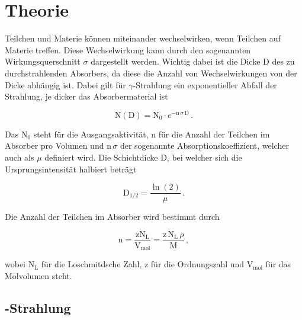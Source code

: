 \section{Theorie}

\begin{flushleft}
    Teilchen und Materie können miteinander wechselwirken, wenn Teilchen auf Materie treffen.
    Diese Wechselwirkung kann durch den sogenannten Wirkungsquerschnitt $\sigma$ dargestellt werden.
    Wichtig dabei ist die Dicke D des zu durchstrahlenden Absorbers, da diese die Anzahl von Wechselwirkungen von der Dicke abhängig ist.
    Dabei gilt für $\gamma$-Strahlung ein exponentieller Abfall der Strahlung, je dicker das Absorbermaterial ist
\end{flushleft}

\begin{equation}
    \text{N}(\text{D}) = \text{N}_{0} \cdot e^{-\text{n}\,\sigma\,\text{D}}\,. \label{1}
\end{equation}

\begin{flushleft}
    Das $\text{N}_{0}$ steht für die Ausgangsaktivität, n für die Anzahl der Teilchen im Absorber pro Volumen und $\text{n}\,\sigma$ der sogenannte Absorptionskoeffizient, welcher auch als $\mu$ definiert wird.
    Die Schichtdicke D, bei welcher sich die Ursprungsintensität halbiert beträgt 
\end{flushleft}

\begin{equation}
    \text{D}_{1/2} = \frac{\ln(2)}{\mu}\,. \label{2}
\end{equation}

\begin{flushleft}
    Die Anzahl der Teilchen im Absorber wird bestimmt durch
\end{flushleft}

\begin{equation}
    \text{n} = \frac{\text{z}\text{N}_{\text{L}}}{\text{V}_{\text{mol}}} = \frac{\text{z}\,\text{N}_{\text{L}}\,\rho}{\text{M}}\,, \label{3}
\end{equation}

\begin{flushleft}
    wobei $\text{N}_{\text{L}}$ für die Loschmitdsche Zahl, z für die Ordnungszahl und $\text{V}_{\text{mol}}$ für das Molvolumen steht.
\end{flushleft}

\subsection{\textgamma-Strahlung}


